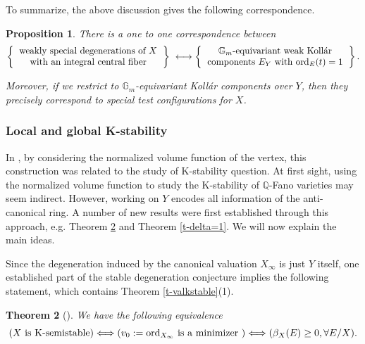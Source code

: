 \documentclass[12pt,reqno]{amsart}%
\newcommand{\bG}{{\mathbb{G} }}
\newcommand{\ord}{{\rm ord}}
\newtheorem{thm}{Theorem}[section]
\newtheorem{prop}[thm]{Proposition}
\theoremstyle{definition}
\theoremstyle{remark}
\newcommand{\bQ}{{\mathbb{Q}}}
\begin{document}
\begin{subappendices}


To summarize,  the above discussion gives the following correspondence. 

\begin{prop}\label{p-corresp}
There is a one to one correspondence between 
 \[
\left\{
  \begin{tabular}{c}
\mbox{weakly special degenerations of $X$}\\
with an integral central fiber
  \end{tabular}
\right\} 
\ \longleftrightarrow
 \left\{
  \begin{tabular}{c}
\mbox{$\mathbb{G}_m$-equivariant  weak Koll\'ar}\\
\mbox{components $E_Y$ with $\ord_E(t)=1$}\\
  \end{tabular}
\right\}.
\]

Moreover, if we restrict to $\bG_m$-equivariant Koll\'ar components over $Y$, then they precisely correspond to special test configurations for $X$.
\end{prop}




\subsubsection{Local and global K-stability}\label{ss-localglobal}

In \cite{Li17},  by considering  the normalized volume function of the vertex, this construction was related to the study of K-stability question.
At first sight, using the normalized volume function to study the K-stability of $\bQ$-Fano varieties may seem indirect. However, working on $Y$ encodes all information of the anti-canonical ring. A number of new results were first established through this approach, e.g. Theorem \ref{t-maintheorem1} and Theorem \ref{t-delta=1}. We will now explain the main ideas. 

\medskip

 Since the degeneration induced by the canonical valuation $X_{\infty}$ is just $Y$ itself,  one established part of the stable degeneration conjecture implies the following statement, which contains Theorem \ref{t-valkstable}(1). 
 \begin{thm}[{\cite{Li17,LL19, LX20}}]\label{t-maintheorem1} 
 We have the following equivalence
\[
(X\mbox{ is K-semistable})\Longleftrightarrow(\mbox{$v_0:=\ord_{X_{\infty}}$ is a minimizer })\Longleftrightarrow (\beta_X(E)\ge 0, \forall E /X).
\]
 \end{thm}



\end{subappendices}
\end{document}
